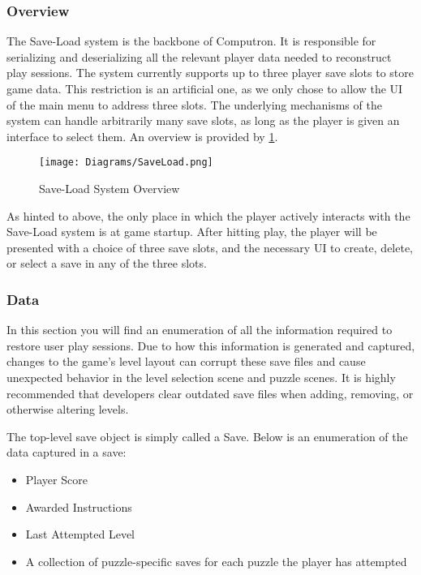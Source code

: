 \subsubsection{Overview}
The Save-Load system is the backbone of Computron. It is responsible for serializing and deserializing all the relevant player data needed to reconstruct play sessions. The system currently supports up to three player save slots to store game data. This restriction is an artificial one, as we only chose to allow the UI of the main menu to address three slots. The underlying mechanisms of the system can handle arbitrarily many save slots, as long as the player is given an interface to select them. An overview is provided by \ref{fig:saveload_system_diagram}.

\begin{figure}[!hb]
    \caption{Save-Load System Overview}
    \label{fig:saveload_system_diagram}
    \centering
    \texttt{[image: Diagrams/SaveLoad.png]}
\end{figure}

As hinted to above, the only place in which the player actively interacts with the Save-Load system is at game startup. After hitting play, the player will be presented with a choice of three save slots, and the necessary UI to create, delete, or select a save in any of the three slots. 

\subsubsection{Data}
In this section you will find an enumeration of all the information required to restore user play sessions. Due to how this information is generated and captured, changes to the game's level layout can corrupt these save files and cause unexpected behavior in the level selection scene and puzzle scenes. It is highly recommended that developers clear outdated save files when adding, removing, or otherwise altering levels.

The top-level save object is simply called a Save. Below is an enumeration of the data captured in a save:
\begin{itemize}
    \item Player Score
    \item Awarded Instructions
    \item Last Attempted Level
    \item A collection of puzzle-specific saves for each puzzle the player has attempted
\end{itemize}

